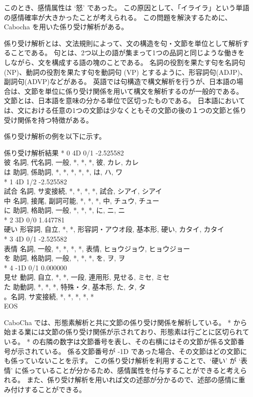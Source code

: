 \documentclass[11pt,a4j]{jsarticle}
\begin{document}
このとき、感情属性は `怒' であった。
この原因として、「イライラ」という単語の感情確率が大きかったことが考えられる。
この問題を解決するために、Cabocha を用いた係り受け解析がある。

係り受け解析とは、文法規則によって、文の構造を句・文節を単位として解析することである。
句とは、2つ以上の語が集まって1つの品詞と同じような働きをしながら、文を構成する語の塊のことである。
名詞の役割を果たす句を名詞句 (NP)、動詞の役割を果たす句を動詞句 (VP) とするように、形容詞句(ADJP)、副詞句(ADVP)などがある。
英語では句構造で構文解析を行うが、日本語の場合は、文節を単位に係り受け関係を用いて構文を解析するのが一般的である。
文節とは、日本語を意味の分かる単位で区切ったものである。
日本語においては、文における任意の1つの文節は少なくともその文節の後の１つの文節と係り受け関係を持つ特徴がある。

係り受け解析の例を以下に示す。

\begin{itembox}[l]{係り受け解析結果}
  * 0 4D 0/1 -2.525582\\
  彼 名詞, 代名詞, 一般, *, *, *, 彼, カレ, カレ \\
  は 助詞, 係助詞, *, *, *, *, *, は, ハ, ワ \\
  * 1 4D 1/2 -2.525582\\
  試合 名詞, サ変接続, *, *, *, *, 試合, シアイ, シアイ \\
  中 名詞, 接尾, 副詞可能, *, *, *, 中, チュウ, チュー \\
  に 助詞, 格助詞, 一般, *, *, *, に, ニ, ニ \\
  * 2 3D 0/0 1.447781\\
  硬い 形容詞, 自立, *, *, 形容詞・アウオ段, 基本形, 硬い, カタイ, カタイ \\
  * 3 4D 0/1 -2.525582\\
  表情 名詞, 一般, *, *, *, *, 表情, ヒョウジョウ, ヒョウジョー \\
  を 助詞, 格助詞, 一般, *, *, *, を, ヲ, ヲ \\
  * 4 -1D 0/1 0.000000\\
  見せ 動詞, 自立, *, *, 一段, 連用形, 見せる, ミセ, ミセ\\
  た 助動詞, *, *, *, 特殊・タ, 基本形, た, タ, タ\\
  。名詞, サ変接続, *, *, *, *, * \\
  EOS \\
\end{itembox}

CaboCha では、形態素解析と共に文節の係り受け関係を解析している。
* から始まる業には文節の係り受け関係が示されており、形態素は行ごとに区切られている。
* の右隣の数字は文節番号を表し、その右横にはその文節が係る文節番号が示されている。
係る文節番号が -1D であった場合、その文節はどの文節にも係っていないことを示す。
この係り受け解析を利用することで、`硬い' が `表情' に係っていることが分かるため、感情属性を付与することができると考えられる。
また、係り受け解析を用いれば文の述部が分かるので、述部の感情に重み付けすることができる。
\end{document}
